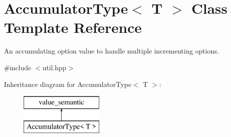 \hypertarget{classAccumulatorType}{}\section{Accumulator\+Type$<$ T $>$ Class Template Reference}
\label{classAccumulatorType}


An accumulating option value to handle multiple incrementing options.  




{\ttfamily \#include $<$util.\+hpp$>$}

Inheritance diagram for Accumulator\+Type$<$ T $>$\+:\begin{figure}[H]
\begin{center}
\leavevmode
\includegraphics[height=2.000000cm]{classAccumulatorType}
\end{center}
\end{figure}

